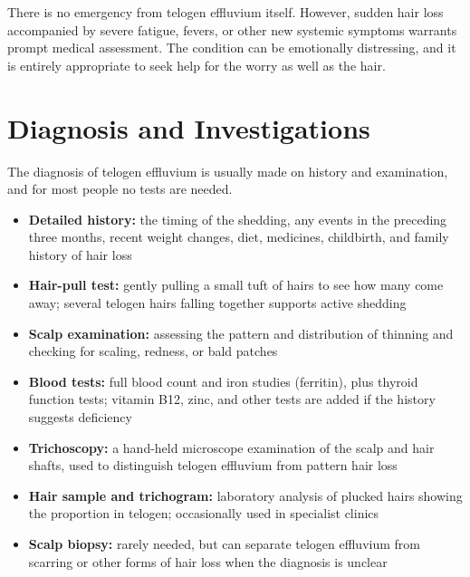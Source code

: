 There is no emergency from telogen effluvium itself. However, sudden hair loss accompanied by severe fatigue, fevers, or other new systemic symptoms warrants prompt medical assessment. The condition can be emotionally distressing, and it is entirely appropriate to seek help for the worry as well as the hair.

\section*{Diagnosis and Investigations}
The diagnosis of telogen effluvium is usually made on history and examination, and for most people no tests are needed.

\begin{itemize}
    \item \textbf{Detailed history:} the timing of the shedding, any events in the preceding three months, recent weight changes, diet, medicines, childbirth, and family history of hair loss
    \item \textbf{Hair-pull test:} gently pulling a small tuft of hairs to see how many come away; several telogen hairs falling together supports active shedding
    \item \textbf{Scalp examination:} assessing the pattern and distribution of thinning and checking for scaling, redness, or bald patches
    \item \textbf{Blood tests:} full blood count and iron studies (ferritin), plus thyroid function tests; vitamin B12, zinc, and other tests are added if the history suggests deficiency
    \item \textbf{Trichoscopy:} a hand-held microscope examination of the scalp and hair shafts, used to distinguish telogen effluvium from pattern hair loss
    \item \textbf{Hair sample and trichogram:} laboratory analysis of plucked hairs showing the proportion in telogen; occasionally used in specialist clinics
    \item \textbf{Scalp biopsy:} rarely needed, but can separate telogen effluvium from scarring or other forms of hair loss when the diagnosis is unclear
\end{itemize}


